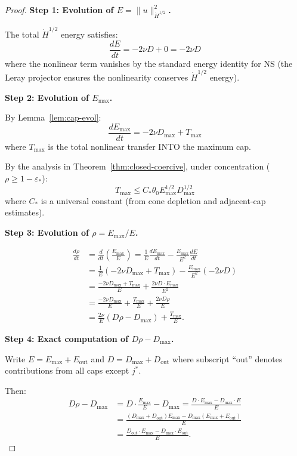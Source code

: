 \documentclass[11pt]{article}
\theoremstyle{definition}
\begin{document}
\begin{proof}
\textbf{Step 1: Evolution of $E = \|u\|_{\dot{H}^{1/2}}^2$.}

The total $\dot{H}^{1/2}$ energy satisfies:
\begin{equation}
\frac{dE}{dt} = -2\nu D + 0 = -2\nu D
\end{equation}
where the nonlinear term vanishes by the standard energy identity for NS (the Leray projector ensures the nonlinearity conserves $\dot{H}^{1/2}$ energy).

\textbf{Step 2: Evolution of $E_{\max}$.}

By Lemma~\ref{lem:cap-evol}:
\begin{equation}
\frac{dE_{\max}}{dt} = -2\nu D_{\max} + T_{\max}
\end{equation}
where $T_{\max}$ is the total nonlinear transfer INTO the maximum cap.

By the analysis in Theorem~\ref{thm:closed-coercive}, under concentration ($\rho \geq 1 - \varepsilon_*$):
\begin{equation}\label{eq:Tmax-bound}
T_{\max} \leq C_* \theta_0 E_{\max}^{1/2} D_{\max}^{1/2}
\end{equation}
where $C_*$ is a universal constant (from cone depletion and adjacent-cap estimates).

\textbf{Step 3: Evolution of $\rho = E_{\max}/E$.}

\begin{align}
\frac{d\rho}{dt} &= \frac{d}{dt}\left(\frac{E_{\max}}{E}\right) = \frac{1}{E}\frac{dE_{\max}}{dt} - \frac{E_{\max}}{E^2}\frac{dE}{dt} \\
&= \frac{1}{E}\left(-2\nu D_{\max} + T_{\max}\right) - \frac{E_{\max}}{E^2}(-2\nu D) \\
&= \frac{-2\nu D_{\max} + T_{\max}}{E} + \frac{2\nu D \cdot E_{\max}}{E^2} \\
&= \frac{-2\nu D_{\max}}{E} + \frac{T_{\max}}{E} + \frac{2\nu D \rho}{E} \\
&= \frac{2\nu}{E}\left(D\rho - D_{\max}\right) + \frac{T_{\max}}{E}.
\end{align}

\textbf{Step 4: Exact computation of $D\rho - D_{\max}$.}

Write $E = E_{\max} + E_{\text{out}}$ and $D = D_{\max} + D_{\text{out}}$ where subscript ``out'' denotes contributions from all caps except $j^*$.

Then:
\begin{align}
D\rho - D_{\max} &= D \cdot \frac{E_{\max}}{E} - D_{\max} = \frac{D \cdot E_{\max} - D_{\max} \cdot E}{E} \\
&= \frac{(D_{\max} + D_{\text{out}}) E_{\max} - D_{\max}(E_{\max} + E_{\text{out}})}{E} \\
&= \frac{D_{\text{out}} \cdot E_{\max} - D_{\max} \cdot E_{\text{out}}}{E}.
\end{align}


\end{proof}
\end{document}
